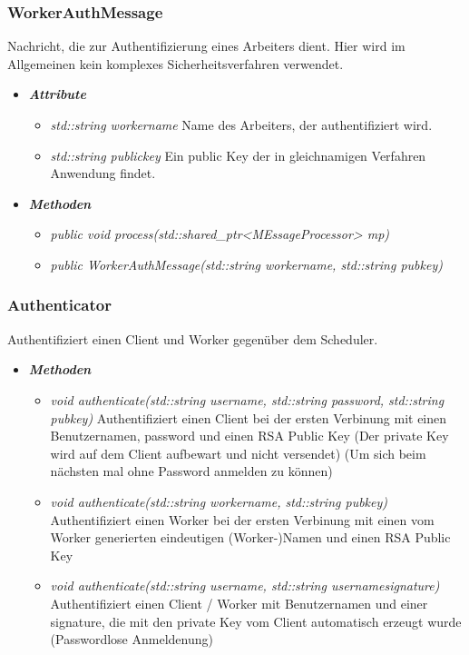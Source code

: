 \documentclass[a4paper,12pt]{article}
\begin{document}
\subsubsection{WorkerAuthMessage}

Nachricht, die zur Authentifizierung eines Arbeiters dient. Hier wird im Allgemeinen kein komplexes Sicherheitsverfahren verwendet.

	\begin{itemize}[label={}]

	\item\textit{\textbf{Attribute}}
		\begin{itemize}[label={\textbullet}]
			\item\textit{std::string workername} Name des Arbeiters, der authentifiziert wird.
			\item\textit{std::string publickey} Ein public Key der in gleichnamigen Verfahren Anwendung findet.
		\end{itemize}

	\item\textit{\textbf{Methoden}}
		\begin{itemize}[label={\textbullet}]
			\item\textit{public void process(std::shared\_ptr<MEssageProcessor> mp)}
			\item\textit{public WorkerAuthMessage(std::string workername, std::string pubkey)}
		\end{itemize}

\end{itemize}

\subsubsection{Authenticator}

Authentifiziert einen Client und Worker gegenüber dem Scheduler.

\begin{itemize}[label={}]

	\item \textit{\textbf{Methoden}}
		\begin{itemize}[label={\textbullet}]
			\item \textit{void authenticate(std::string username, std::string password, std::string pubkey)} Authentifiziert einen Client bei der ersten Verbinung mit einen Benutzernamen, password und einen RSA Public Key (Der private Key wird auf dem Client aufbewart und nicht versendet) (Um sich beim nächsten mal ohne Password anmelden zu können)
			\item \textit{void authenticate(std::string workername, std::string pubkey)} Authentifiziert einen Worker bei der ersten Verbinung mit einen vom Worker generierten eindeutigen (Worker-)Namen und einen RSA Public Key
			\item \textit{void authenticate(std::string username, std::string usernamesignature)} Authentifiziert einen Client / Worker mit Benutzernamen und einer signature, die mit den private Key vom Client automatisch erzeugt wurde (Passwordlose Anmeldenung)
		\end{itemize}


\end{itemize}
\end{document}
